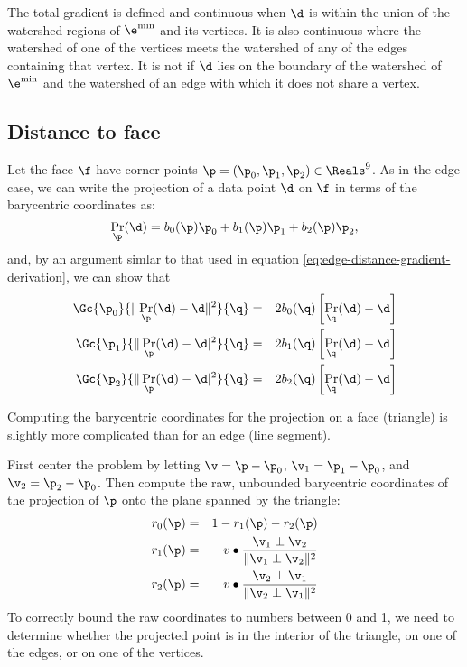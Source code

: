 The total gradient is defined and continuous
when $\d$ is within the union of the watershed regions
of $\e^{\min}$ and its vertices.
It is also continuous where the watershed of one of the vertices
meets the watershed of any of the edges containing that vertex.
It is not if $\d$ lies on the boundary of the
watershed of $\e^{\min}$ and the watershed of an
edge with which it does not share a vertex.

\subsection{Distance to face}
\label{sec:Distance-to-face}

Let the face $\f$ have corner points $\p = (\p_0, \p_1, \p_2) \in \Reals^9$.
As in the edge case,
we can write the projection of a data point $\d$ on $\f$
in terms of the barycentric coordinates as:
\begin{equation}
\Pr_\p (\d) = b_0(\p) \p_0 + b_1(\p) \p_1 + b_2(\p) \p_2,
\end{equation}
and, by an argument simlar to that used in
equation \ref{eq:edge-distance-gradient-derivation},
we can show that
\begin{eqnarray}
\label{eq:face-distance-gradient}
\Gc{\p_0}{ \| \Pr_{\p} (\d) - \d \|^2 }{\q}
& = & 2 b_0(\q) \left[ \Pr_{\q} (\d) - \d \right]
\\
\Gc{\p_1}{ \| \Pr_{\p} (\d) - \d|^2 }{\q}
& = & 2 b_1(\q) \left[ \Pr_\q (\d) - \d \right]
\nonumber
\\
\Gc{\p_2}{ \| \Pr_{\p} (\d) - \d|^2 }{\q}
& = & 2 b_2(\q) \left[ \Pr_\q (\d) - \d \right]
\nonumber
\end{eqnarray}

Computing the barycentric coordinates for the projection
on a face (triangle) is slightly more complicated than
for an edge (line segment).

First center the problem by letting
$\v = \p - \p_0$,
$\v_1 = \p_1 - \p_0$, and $\v_2 = \p_2 - \p_0$.
Then compute the raw, unbounded barycentric coordinates
of the projection of $\p$ onto the plane
spanned by the triangle:
\begin{eqnarray}
r_0(\p) & = & 1 - r_1(\p) - r_2(\p)
\\
r_1(\p) & = & v \bullet {{\v_1 \perp \v_2} \over {\| \v_1 \perp \v_2 \|^2} }
\nonumber
\\
r_2(\p) & = & v \bullet {{\v_2 \perp \v_1} \over {\| \v_2 \perp \v_1 \|^2} }
\nonumber
\end{eqnarray}
To correctly bound the raw coordinates to numbers between 0 and 1,
we need to determine whether the projected point is in
the interior of the triangle, on one of the edges,
or on one of the vertices.

